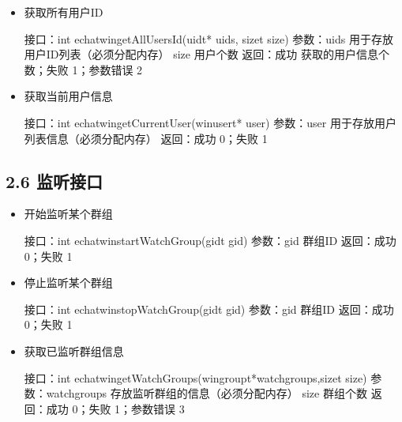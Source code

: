 \documentclass[letterpaper,10pt,english]{sphinxmanual}
\begin{document}
\begin{itemize}
\item {} 
获取所有用户ID

%
\begin{sphinxVerbatim}[commandchars=\\\{\}]
接口：int echat\PYGZus{}win\PYGZus{}getAllUsersId(uid\PYGZus{}t* uids, size\PYGZus{}t size)
参数：uids  用于存放用户ID列表（必须分配内存）
  size  用户个数
返回：成功  获取的用户信息个数；失败 \PYGZhy{}1；参数错误 \PYGZhy{}2
\end{sphinxVerbatim}

\item {} 
获取当前用户信息

%
\begin{sphinxVerbatim}[commandchars=\\\{\}]
接口：int echat\PYGZus{}win\PYGZus{}getCurrentUser(win\PYGZus{}user\PYGZus{}t* user)
参数：user  用于存放用户列表信息（必须分配内存）
返回：成功 0；失败 \PYGZhy{}1
\end{sphinxVerbatim}

\end{itemize}


\subsection{2.6 监听接口}
\label{\detokenize{c_win:id8}}\begin{itemize}
\item {} 
开始监听某个群组

%
\begin{sphinxVerbatim}[commandchars=\\\{\}]
接口：int echat\PYGZus{}win\PYGZus{}startWatchGroup(gid\PYGZus{}t gid)
参数：gid  群组ID
返回：成功 0；失败 \PYGZhy{}1
\end{sphinxVerbatim}

\item {} 
停止监听某个群组

%
\begin{sphinxVerbatim}[commandchars=\\\{\}]
接口：int echat\PYGZus{}win\PYGZus{}stopWatchGroup(gid\PYGZus{}t gid)
参数：gid  群组ID
返回：成功 0；失败 \PYGZhy{}1
\end{sphinxVerbatim}

\item {} 
获取已监听群组信息

%
\begin{sphinxVerbatim}[commandchars=\\\{\}]
接口：int echat\PYGZus{}win\PYGZus{}getWatchGroups(win\PYGZus{}group\PYGZus{}t*watch\PYGZus{}groups,size\PYGZus{}t size)
参数：watch\PYGZus{}groups  存放监听群组的信息（必须分配内存）
  size  群组个数
返回：成功  0；失败 \PYGZhy{}1；参数错误 \PYGZhy{}3
\end{sphinxVerbatim}

\end{itemize}
\end{document}
